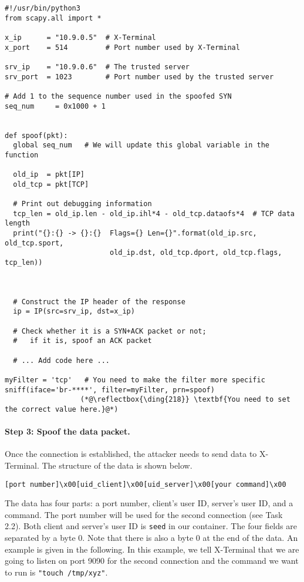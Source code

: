 \begin{lstlisting}
#!/usr/bin/python3
from scapy.all import *

x_ip      = "10.9.0.5"  # X-Terminal
x_port    = 514         # Port number used by X-Terminal

srv_ip    = "10.9.0.6"  # The trusted server
srv_port  = 1023        # Port number used by the trusted server

# Add 1 to the sequence number used in the spoofed SYN
seq_num     = 0x1000 + 1


def spoof(pkt):
  global seq_num   # We will update this global variable in the function

  old_ip  = pkt[IP]
  old_tcp = pkt[TCP]

  # Print out debugging information
  tcp_len = old_ip.len - old_ip.ihl*4 - old_tcp.dataofs*4  # TCP data length
  print("{}:{} -> {}:{}  Flags={} Len={}".format(old_ip.src, old_tcp.sport,
                         old_ip.dst, old_tcp.dport, old_tcp.flags, tcp_len))



  # Construct the IP header of the response
  ip = IP(src=srv_ip, dst=x_ip)

  # Check whether it is a SYN+ACK packet or not;
  #   if it is, spoof an ACK packet

  # ... Add code here ...

myFilter = 'tcp'   # You need to make the filter more specific
sniff(iface='br-****', filter=myFilter, prn=spoof)
                  (*@\reflectbox{\ding{218}} \textbf{You need to set the correct value here.}@*)   
\end{lstlisting}




\paragraph{Step 3: Spoof the \rsh data packet.}
Once the connection is established, the attacker needs to 
send \rsh data to X-Terminal.
The structure of the \rsh data is shown below.

\begin{lstlisting}
[port number]\x00[uid_client]\x00[uid_server]\x00[your command]\x00
\end{lstlisting}

The data has four parts: a port number, client's user ID, server's user ID,
and a command.
The port number will be used for the second connection (see Task 2.2). 
Both client and server's user ID is \texttt{seed} in our container. 
The four fields are separated by a byte 0.
Note that there is also a byte 0 at the end of the \rsh data. An example is given in the
following. In this example, we tell X-Terminal that we are going to listen on port 9090 for the
second connection and the command we want to run is \texttt{"touch /tmp/xyz"}. 

